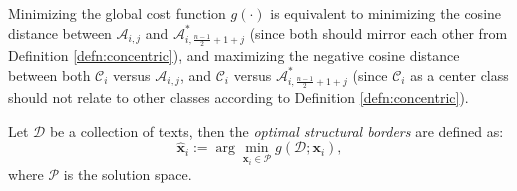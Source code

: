 \begin{remark}
    Minimizing the global cost function $g(\cdot)$ is equivalent to minimizing the cosine distance between $\mathscr{A}_{i,j}$ and $\mathscr{A}_{i,\frac{n-1}{2}+1+j}^{*}$ (since both should mirror each other from Definition \ref{defn:concentric}), and maximizing the negative cosine distance between both $\mathscr{C}_i$ versus $\mathscr{A}_{i,j}$, and $\mathscr{C}_i$ versus $\mathscr{A}_{i,\frac{n-1}{2}+1+j}^{*}$ (since $\mathscr{C}_i$ as a center class should not relate to other classes according to Definition \ref{defn:concentric}).
\end{remark}

\begin{defn}\label{defn:optimal_structural_borders}
    Let $\mathscr{D}$ be a collection of texts, then the \textit{optimal structural borders} are defined as:
    \begin{equation}
        \hat{\mathbf{x}}_{i}:=\arg\min_{\mathbf{x}_i\in\mathscr{P}}g(\mathscr{D};\mathbf{x}_i),
    \end{equation}
    where $\mathscr{P}$ is the solution space.
\end{defn}
